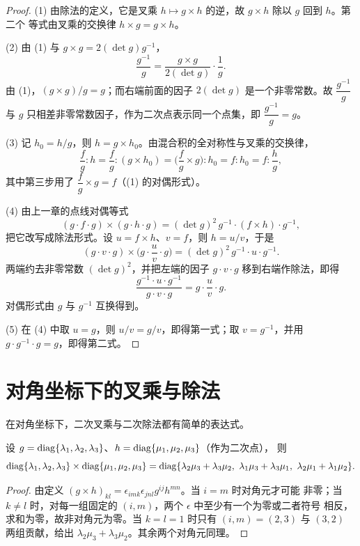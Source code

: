 \begin{proof}
(1) 由除法的定义，它是叉乘 $h\mapsto g\times h$ 的逆，故 $g\times h$ 除以 $g$ 回到 $h$。第二个
等式由叉乘的交换律 $h\times g=g\times h$。

(2) 由 (1) 与 $g\times g=2(\det g)g^{-1}$，
\[
\frac{g^{-1}}{g}=\frac{g\times g}{2(\det g)}\cdot\frac1g .
\]
由 (1)，$(g\times g)/g=g$；而右端前面的因子 $2(\det g)$ 是一个非零常数。故
$\dfrac{g^{-1}}{g}$ 与 $g$ 只相差非零常数因子，作为二次点表示同一个点集，即
$\dfrac{g^{-1}}{g}=g$。

(3) 记 $h_0=h/g$，则 $h=g\times h_0$。由混合积的全对称性与叉乘的交换律，
\[
\frac fg:h=\frac fg:(g\times h_0)
=\Big(\frac fg\times g\Big):h_0=f:h_0=f:\frac hg ,
\]
其中第三步用了 $\dfrac fg\times g=f$（(1) 的对偶形式）。

(4) 由上一章的点线对偶等式
\[
(g\cdot f\cdot g)\times(g\cdot h\cdot g)=(\det g)^2\,g^{-1}\cdot(f\times h)\cdot g^{-1},
\]
把它改写成除法形式。设 $u=f\times h$、$v=f$，则 $h=u/v$，于是
\[
(g\cdot v\cdot g)\times\Big(g\cdot\frac uv\cdot g\Big)
=(\det g)^2\,g^{-1}\cdot u\cdot g^{-1}.
\]
两端约去非零常数 $(\det g)^2$，并把左端的因子 $g\cdot v\cdot g$ 移到右端作除法，即得
\[
\frac{g^{-1}\cdot u\cdot g^{-1}}{g\cdot v\cdot g}=g\cdot\frac uv\cdot g .
\]
对偶形式由 $g$ 与 $g^{-1}$ 互换得到。

(5) 在 (4) 中取 $u=g$，则 $u/v=g/v$，即得第一式；取 $v=g^{-1}$，并用
$g\cdot g^{-1}\cdot g=g$，即得第二式。
\end{proof}

\section{对角坐标下的叉乘与除法}

在对角坐标下，二次叉乘与二次除法都有简单的表达式。

\begin{proposition}
\label{prop:diag-cross2}
设 $g=\operatorname{diag}\{\lambda_1,\lambda_2,\lambda_3\}$、$h=\operatorname{diag}\{\mu_1,\mu_2,\mu_3\}$（作为二次点），
则
\begin{equation}
\label{eq:cross-diag}
\operatorname{diag}\{\lambda_1,\lambda_2,\lambda_3\}\times\operatorname{diag}\{\mu_1,\mu_2,\mu_3\}
=\operatorname{diag}\{\lambda_2\mu_3+\lambda_3\mu_2,\
\lambda_1\mu_3+\lambda_3\mu_1,\
\lambda_2\mu_1+\lambda_1\mu_2\}.
\end{equation}
\end{proposition}

\begin{proof}
由定义 $(g\times h)_{kl}=\epsilon_{imk}\epsilon_{jnl}g^{ij}h^{mn}$。当 $i=m$ 时对角元才可能
非零；当 $k\ne l$ 时，对每一组固定的 $(i,m)$，两个 $\epsilon$ 中至少有一个为零或二者符号
相反，求和为零，故非对角元为零。当 $k=l=1$ 时只有 $(i,m)=(2,3)$ 与 $(3,2)$ 两组贡献，给出
$\lambda_2\mu_3+\lambda_3\mu_2$。其余两个对角元同理。
\end{proof}

